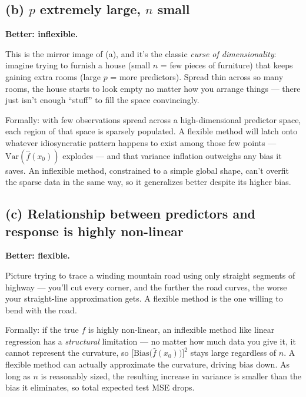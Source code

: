 \documentclass[
  11pt,
]{article}
\begin{document}
\subsection{\texorpdfstring{(b) \(p\) extremely large, \(n\)
small}{(b) p extremely large, n small}}\label{b-p-extremely-large-n-small}

\textbf{Better: inflexible.}

This is the mirror image of (a), and it's the classic \emph{curse of
dimensionality}: imagine trying to furnish a house (small \(n\) = few
pieces of furniture) that keeps gaining extra rooms (large \(p\) = more
predictors). Spread thin across so many rooms, the house starts to look
empty no matter how you arrange things --- there just isn't enough
``stuff'' to fill the space convincingly.

Formally: with few observations spread across a high-dimensional
predictor space, each region of that space is sparsely populated. A
flexible method will latch onto whatever idiosyncratic pattern happens
to exist among those few points --- \(\text{Var}(\hat{f}(x_0))\)
explodes --- and that variance inflation outweighs any bias it saves. An
inflexible method, constrained to a simple global shape, can't overfit
the sparse data in the same way, so it generalizes better despite its
higher bias.

\subsection{(c) Relationship between predictors and response is highly
non-linear}\label{c-relationship-between-predictors-and-response-is-highly-non-linear}

\textbf{Better: flexible.}

Picture trying to trace a winding mountain road using only straight
segments of highway --- you'll cut every corner, and the further the
road curves, the worse your straight-line approximation gets. A flexible
method is the one willing to bend with the road.

Formally: if the true \(f\) is highly non-linear, an inflexible method
like linear regression has a \emph{structural} limitation --- no matter
how much data you give it, it cannot represent the curvature, so
\(\big[\text{Bias}\big(\hat{f}(x_0)\big)\big]^2\) stays large regardless
of \(n\). A flexible method can actually approximate the curvature,
driving bias down. As long as \(n\) is reasonably sized, the resulting
increase in variance is smaller than the bias it eliminates, so total
expected test MSE drops.
\end{document}
